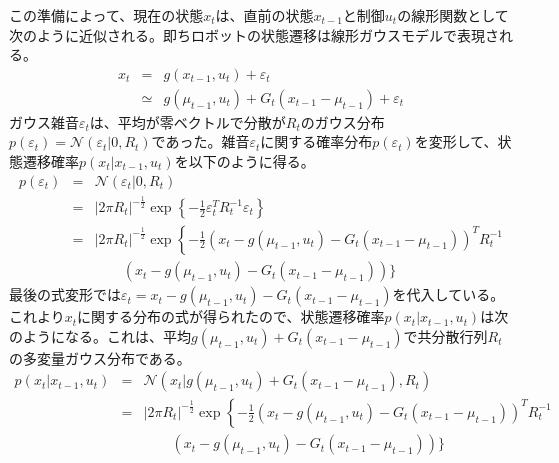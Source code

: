 \documentclass[dvipdfmx,a4paper]{jsarticle}
\begin{document}
この準備によって、現在の状態$x_t$は、直前の状態$x_{t - 1}$と制御$u_t$の線形関数として次のように近似される。即ちロボットの状態遷移は線形ガウスモデルで表現される。
\begin{eqnarray}
	x_t &=& g(x_{t - 1}, u_t) + \varepsilon_t \nonumber \\
	&\simeq& g(\mu_{t - 1}, u_t) + G_t \left( x_{t - 1} - \mu_{t - 1} \right) + \varepsilon_t
\end{eqnarray}
ガウス雑音$\varepsilon_t$は、平均が零ベクトルで分散が$R_t$のガウス分布$p(\varepsilon_t) = \mathcal{N}(\varepsilon_t | 0, R_t)$であった。雑音$\varepsilon_t$に関する確率分布$p(\varepsilon_t)$を変形して、状態遷移確率$p(x_t | x_{t - 1}, u_t)$を以下のように得る。
\begin{eqnarray}
	p(\varepsilon_t) &=& \mathcal{N}(\varepsilon_t | 0, R_t) \nonumber \\
	&=& \left| 2 \pi R_t \right|^{-\frac{1}{2}} \exp \left\{ -\frac{1}{2} \varepsilon_t^T R_t^{-1} \varepsilon_t \right\} \nonumber \\
	&=& \left| 2 \pi R_t \right|^{-\frac{1}{2}} \exp \left\{ -\frac{1}{2} \left( x_t - g(\mu_{t - 1}, u_t) - G_t \left( x_{t - 1} - \mu_{t - 1} \right) \right)^T R_t^{-1} \right. \nonumber \\
	&& \qquad \left( x_t - g(\mu_{t - 1}, u_t) - G_t \left( x_{t - 1} - \mu_{t - 1} \right) \right) \bigg\}
\end{eqnarray}
最後の式変形では$\varepsilon_t = x_t - g(\mu_{t - 1}, u_t) - G_t \left( x_{t - 1} - \mu_{t - 1} \right)$を代入している。これより$x_t$に関する分布の式が得られたので、状態遷移確率$p(x_t | x_{t - 1}, u_t)$は次のようになる。これは、平均$g(\mu_{t - 1}, u_t) + G_t \left( x_{t - 1} - \mu_{t - 1} \right)$で共分散行列$R_t$の多変量ガウス分布である。
\begin{eqnarray}
	p(x_t | x_{t - 1}, u_t) &=& \mathcal{N}(x_t | g(\mu_{t - 1}, u_t) + G_t \left( x_{t - 1} - \mu_{t - 1} \right), R_t) \\
	&=& \left| 2 \pi R_t \right|^{-\frac{1}{2}} \exp \left\{ -\frac{1}{2} \left( x_t - g(\mu_{t - 1}, u_t) - G_t \left( x_{t - 1} - \mu_{t - 1} \right) \right)^T R_t^{-1} \right. \nonumber \\
	&& \qquad \left( x_t - g(\mu_{t - 1}, u_t) - G_t \left( x_{t - 1} - \mu_{t - 1} \right) \right) \bigg\}
\end{eqnarray}
\end{document}
